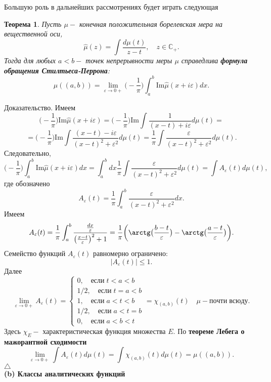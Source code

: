 \documentclass[12 pt, a4 paper]{article}
\theoremstyle{plain}   \newtheorem{Pro}{Задача}
\newtheorem{The}{Теорема}
\begin{document}
Большую роль в дальнейших рассмотрениях будет играть следующая
\begin{The}
Пусть
$ \mu - $
конечная положительная борелевская мера на вещественной оси,
$$
  \hat \mu (z) = \int \frac{d \mu (t)}{z-t},
  \quad z \in \mathbb{C}_+ .
$$
Тогда для любых
$ a<b - $
точек непрерывности меры
$ \mu $
справедлива
{\bfseries формула обращения Стилтьеса-Перрона}:
$$
  \mu ((a,b)) = \lim _{\varepsilon \rightarrow 0+}
  \bigl ( - \frac{1}{\pi} \bigr )
  \int _a ^b \mathrm{Im} \hat \mu (x+i \varepsilon ) dx.
$$
\end{The}
{\Large Доказательство.}
Имеем
$$
  \bigl ( - \frac{1}{\pi} \bigr )
  \mathrm{Im} \hat \mu (x+i \varepsilon ) =
  \bigl ( - \frac{1}{\pi} \bigr )
  \mathrm{Im} \int \frac{1}{(x-t)+i \varepsilon } d \mu (t) =
$$
$$
  =\bigl (-\frac{1}{\pi} \bigr )
  \mathrm{Im} \int \frac{(x-t)-i \varepsilon}{(x-t)^2 + \varepsilon ^2}
  d \mu (t) = \frac{1}{\pi} \int
  \frac{\varepsilon}{(x-t)^2 +\varepsilon ^2}d \mu (t).
$$
Следовательно,
$$
  \bigl ( - \frac{1}{\pi} \bigr ) \int _a ^b
  \mathrm{Im} \hat \mu (x+i \varepsilon )dx=
  \int _a ^b dx \frac{1}{\pi} \int
  \frac{\varepsilon}{(x-t)^2 +\varepsilon ^2} d \mu (t) =
  \int A_{\varepsilon}(t) d \mu (t) ,
$$
где обозначено
$$
  A_{\varepsilon}(t) = \frac{1}{\pi} \int _a ^b
  \frac{\varepsilon}{(x-t)^2 +\varepsilon ^2}dx.
$$
Имеем
$$
  A_{\varepsilon}(t)= \frac{1}{\pi} \int _a ^b
  \frac{\frac{dx}{\varepsilon}}{\bigl (
  \frac{x-t}{\varepsilon} \bigr ) ^2 +1 } =
  \frac{1}{\pi} \biggl ( \arctg \bigl (
  \frac{b-t}{\varepsilon} \bigr ) -
  \arctg \bigl ( \frac{a-t}{\varepsilon} \bigr ) \biggr ).
$$
Семейство функций
$ A_{\varepsilon}(t) $
равномерно ограничено:
$$
  |A_{\varepsilon}(t)| \leq 1.
$$
Далее
\begin{equation*}
  \lim _{\varepsilon \rightarrow 0+} A_{\varepsilon}(t) =
    \begin{cases}
	  0, \quad если \; t<a<b \\
	  1/2, \quad если \; t=a<b \\
	  1, \quad если \; a<t<b \\
	  1/2, \quad если \; a<t=b \\
	  0, \quad если \; a<b<t
	\end{cases}
  = \chi _{(a,b)}(t) \quad \mu - почти \; всюду.
\end{equation*}
Здесь
$ \chi _E - $
характеристическая функция множества
$ E . $
По
{\bfseries теореме Лебега о мажорантной сходимости}
$$
  \lim _{\varepsilon \rightarrow 0+}
  \int A_{\varepsilon}(t) d \mu (t) =
  \int \chi _{(a,b)}(t) d \mu (t) =
  \mu ((a,b)).
$$
$ \triangle $
$$ \; $$
{\bfseries (b) Классы аналитических функций}\\
\end{document}
